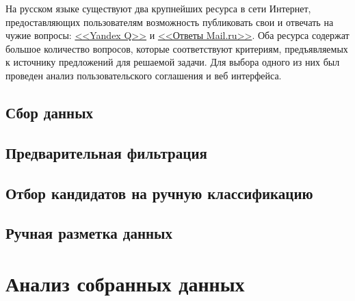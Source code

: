\documentclass[a4paper,14pt]{extarticle}
\begin{document}
На русском языке существуют два крупнейших ресурса в сети Интернет, предоставляющих пользователям возможность публиковать свои и отвечать на чужие вопросы: \href{https://yandex.ru/q/}{<<Yandex Q>>} и \href{https://otvet.mail.ru/}{<<Ответы Mail.ru>>}.
Оба ресурса содержат большое количество вопросов, которые соответствуют критериям, предъявляемых к источнику предложений для решаемой задачи.
Для выбора одного из них был проведен анализ пользовательского соглашения и веб интерфейса.


\subsection{Сбор данных}
\subsection{Предварительная фильтрация}
\subsection{Отбор кандидатов на ручную классификацию}
\subsection{Ручная разметка данных}

\section{Анализ собранных данных}

\newpage 
\printbibliography
\end{document}
